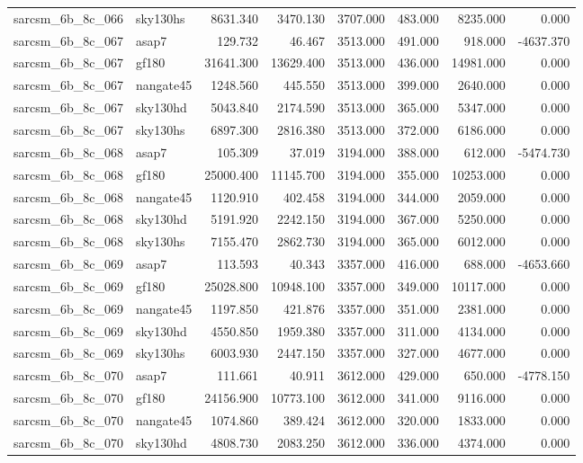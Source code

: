 \begin{tabular}{llrrrrrr}
sarcsm\_6b\_8c\_066 & sky130hs & 8631.340 & 3470.130 & 3707.000 & 483.000 & 8235.000 & 0.000 \\
sarcsm\_6b\_8c\_067 & asap7 & 129.732 & 46.467 & 3513.000 & 491.000 & 918.000 & -4637.370 \\
sarcsm\_6b\_8c\_067 & gf180 & 31641.300 & 13629.400 & 3513.000 & 436.000 & 14981.000 & 0.000 \\
sarcsm\_6b\_8c\_067 & nangate45 & 1248.560 & 445.550 & 3513.000 & 399.000 & 2640.000 & 0.000 \\
sarcsm\_6b\_8c\_067 & sky130hd & 5043.840 & 2174.590 & 3513.000 & 365.000 & 5347.000 & 0.000 \\
sarcsm\_6b\_8c\_067 & sky130hs & 6897.300 & 2816.380 & 3513.000 & 372.000 & 6186.000 & 0.000 \\
sarcsm\_6b\_8c\_068 & asap7 & 105.309 & 37.019 & 3194.000 & 388.000 & 612.000 & -5474.730 \\
sarcsm\_6b\_8c\_068 & gf180 & 25000.400 & 11145.700 & 3194.000 & 355.000 & 10253.000 & 0.000 \\
sarcsm\_6b\_8c\_068 & nangate45 & 1120.910 & 402.458 & 3194.000 & 344.000 & 2059.000 & 0.000 \\
sarcsm\_6b\_8c\_068 & sky130hd & 5191.920 & 2242.150 & 3194.000 & 367.000 & 5250.000 & 0.000 \\
sarcsm\_6b\_8c\_068 & sky130hs & 7155.470 & 2862.730 & 3194.000 & 365.000 & 6012.000 & 0.000 \\
sarcsm\_6b\_8c\_069 & asap7 & 113.593 & 40.343 & 3357.000 & 416.000 & 688.000 & -4653.660 \\
sarcsm\_6b\_8c\_069 & gf180 & 25028.800 & 10948.100 & 3357.000 & 349.000 & 10117.000 & 0.000 \\
sarcsm\_6b\_8c\_069 & nangate45 & 1197.850 & 421.876 & 3357.000 & 351.000 & 2381.000 & 0.000 \\
sarcsm\_6b\_8c\_069 & sky130hd & 4550.850 & 1959.380 & 3357.000 & 311.000 & 4134.000 & 0.000 \\
sarcsm\_6b\_8c\_069 & sky130hs & 6003.930 & 2447.150 & 3357.000 & 327.000 & 4677.000 & 0.000 \\
sarcsm\_6b\_8c\_070 & asap7 & 111.661 & 40.911 & 3612.000 & 429.000 & 650.000 & -4778.150 \\
sarcsm\_6b\_8c\_070 & gf180 & 24156.900 & 10773.100 & 3612.000 & 341.000 & 9116.000 & 0.000 \\
sarcsm\_6b\_8c\_070 & nangate45 & 1074.860 & 389.424 & 3612.000 & 320.000 & 1833.000 & 0.000 \\
sarcsm\_6b\_8c\_070 & sky130hd & 4808.730 & 2083.250 & 3612.000 & 336.000 & 4374.000 & 0.000 \\

\end{tabular}

